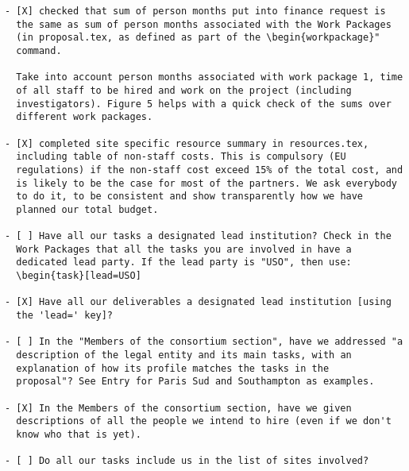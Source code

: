 \begin{draft}
  \vspace{1cm}

\begin{verbatim}
- [X] checked that sum of person months put into finance request is
  the same as sum of person months associated with the Work Packages
  (in proposal.tex, as defined as part of the \begin{workpackage}"
  command.
  
  Take into account person months associated with work package 1, time
  of all staff to be hired and work on the project (including
  investigators). Figure 5 helps with a quick check of the sums over
  different work packages.

- [X] completed site specific resource summary in resources.tex,
  including table of non-staff costs. This is compulsory (EU
  regulations) if the non-staff cost exceed 15% of the total cost, and
  is likely to be the case for most of the partners. We ask everybody
  to do it, to be consistent and show transparently how we have
  planned our total budget.

- [ ] Have all our tasks a designated lead institution? Check in the
  Work Packages that all the tasks you are involved in have a
  dedicated lead party. If the lead party is "USO", then use:
  \begin{task}[lead=USO]

- [X] Have all our deliverables a designated lead institution [using
  the 'lead=' key]?

- [ ] In the "Members of the consortium section", have we addressed "a
  description of the legal entity and its main tasks, with an
  explanation of how its profile matches the tasks in the
  proposal"? See Entry for Paris Sud and Southampton as examples.
  
- [X] In the Members of the consortium section, have we given
  descriptions of all the people we intend to hire (even if we don't
  know who that is yet). 
  
- [ ] Do all our tasks include us in the list of sites involved?
\end{verbatim}
\end{draft}






